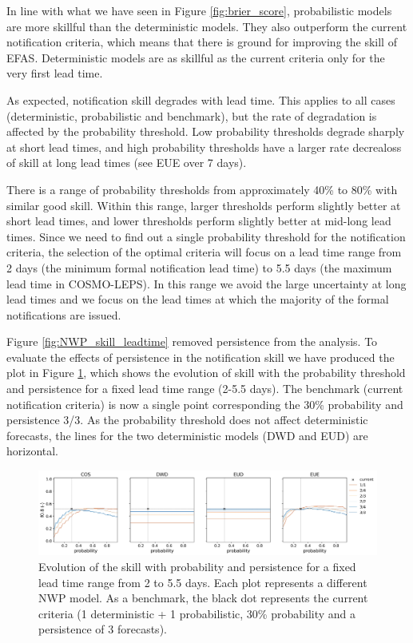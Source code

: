 \documentclass[preprint,12pt]{elsarticle}
\begin{document}
In line with what we have seen in Figure \ref{fig:brier_score}, probabilistic models are more skillful than the deterministic models. They also outperform the current notification criteria, which means that there is ground for improving the skill of EFAS. Deterministic models are as skillful as the current criteria only for the very first lead time.

As expected, notification skill degrades with lead time. This applies to all cases (deterministic, probabilistic and benchmark), but the rate of degradation is affected by the probability threshold. Low probability thresholds degrade sharply at short lead times, and high probability thresholds have a larger rate decrealoss of skill at long lead times (see EUE over 7 days). 

There is a range of probability thresholds from approximately 40\% to 80\% with similar good skill. Within this range, larger thresholds perform slightly better at short lead times, and lower thresholds perform slightly better at mid-long lead times. Since we need to find out a single probability threshold for the notification criteria, the selection of the optimal criteria will focus on a lead time range from 2 days (the minimum formal notification lead time) to 5.5 days (the maximum lead time in COSMO-LEPS). In this range we avoid the large uncertainty at long lead times and we focus on the lead times at which the majority of the formal notifications are issued.

Figure \ref{fig:NWP_skill_leadtime} removed persistence from the analysis. To evaluate the effects of persistence in the notification skill we have produced the plot in Figure \ref{fig:NWP_skill_probability}, which shows the evolution of skill with the probability threshold and persistence for a fixed lead time range (2-5.5 days). The benchmark (current notification criteria) is now a single point corresponding the 30\% probability and persistence 3/3. As the probability threshold does not affect deterministic forecasts, the lines for the two deterministic models (DWD and EUD) are horizontal.

\begin{figure}
    \centering
    \includegraphics[width=1\textwidth]{figures/skill_persistence_probability_060h_NWP.jpg}
    \caption{Evolution of the skill with probability and persistence for a fixed lead time range from 2 to 5.5 days. Each plot represents a different NWP model. As a benchmark, the black dot represents the current criteria (1 deterministic + 1 probabilistic, 30\% probability and a persistence of 3 forecasts).}
    \label{fig:NWP_skill_probability}
\end{figure}
\end{document}
